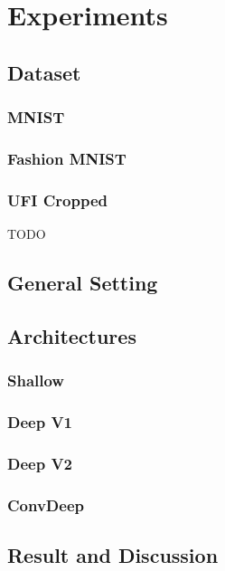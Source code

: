 \chapter{Experiments \label{cha:chapter4}}

\section{Dataset}
\subsection{MNIST}
\subsection{Fashion MNIST}
\subsection{UFI Cropped}
TODO

\section{General Setting}

\section{Architectures}
\subsection{Shallow}
\subsection{Deep V1}
\subsection{Deep V2}
\subsection{ConvDeep}

\section{Result and Discussion}

